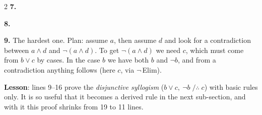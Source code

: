\begin{nbsolution}
\begin{fitchproof}
\open
{} \RAss
{} 
\open
{} \RAss
{} 
 
 
 
 
\close
{} 
\close
{} 
\end{fitchproof}
\begin{multicols}{2}
\textbf{7.}
\begin{fitchproof}
 \RPrem
{} \RPrem
{} \RPrem
\open
{} \RAss
{} 
\close
\open
{} \RAss
{} 
 
\close
{} 
\end{fitchproof}
\columnbreak
\textbf{8.}
\begin{fitchproof}
 \RPrem
{} \RPrem
{} \RPrem
{} \RPrem
{} 
\open
{} \RAss
{} 
 
\close
\open
{} \RAss
{} 
 
\close
{} 
\end{fitchproof}
\end{multicols}
\textbf{9.} The hardest one. Plan: assume $a$, then assume $d$ and look for a contradiction
between $a \land d$ and $\neg(a \land d)$. To get $\neg(a \land d)$ we need $c$, which must
come from $b \lor c$ by cases. In the case $b$ we have both $b$ and $\neg b$, and from a
contradiction anything follows (here $c$, via $\neg$\,Elim).
\begin{fitchproof}
 \RPrem
{} \RPrem
{} \RPrem
\open
{} \RAss
{} 
\open
{} \RAss
{} 
 
\open
{} \RAss
\open
{} \RAss
{} 
 
\close
{} 
\close
\open
{} \RAss
{} 
\close
{} 
 
\close
{} 
\close
{} 
\end{fitchproof}
\textbf{Lesson}: lines 9--16 prove the \emph{disjunctive syllogism} ($b \lor c,\ \neg b
\;/\therefore\; c$) with basic rules only. It is so useful that it becomes a derived rule
in the next sub-section, and with it this proof shrinks from 19 to 11 lines.
\end{nbsolution}

